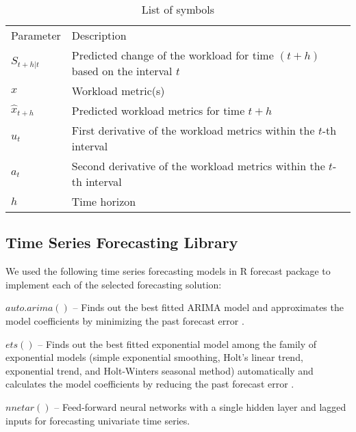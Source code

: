 \begin{table}[]
\centering
\caption{List of symbols}
\label{my-label}
\begin{tabular}{ll}
Parameter       & Description                                                                     \\
$S_{t+h|t}$     & Predicted change of the workload for time $(t+h)$ based on the interval $t$ \\
$x$             & Workload metric(s)                                                                \\
$\hat{x}_{t+h}$ & Predicted workload metrics for time $t+h$                                       \\
$u_{t}$         & First derivative of the workload metrics within the $t$-th interval           \\
$a_{t}$         & Second derivative of the workload metrics within the $t$-th interval          \\
$h$             & Time horizon                    
\end{tabular}
\end{table}


\subsection{Time Series Forecasting Library}

We used the following time series forecasting models in R forecast package \cite{forecastPackage} to implement each of the selected forecasting solution:

$auto.arima()$ -- Finds out the best fitted ARIMA model and approximates the model coefficients by minimizing the past forecast error \cite{Forecasting_OTexts}.

$ets()$ -- Finds out the best fitted exponential model among the family of exponential models (simple exponential smoothing, Holt's linear trend, exponential trend, and Holt-Winters seasonal method) automatically and calculates the model coefficients by reducing the past forecast error \cite{Forecasting_OTexts}.

$nnetar()$ -- Feed-forward neural networks with a single hidden layer and lagged inputs for forecasting univariate time series.